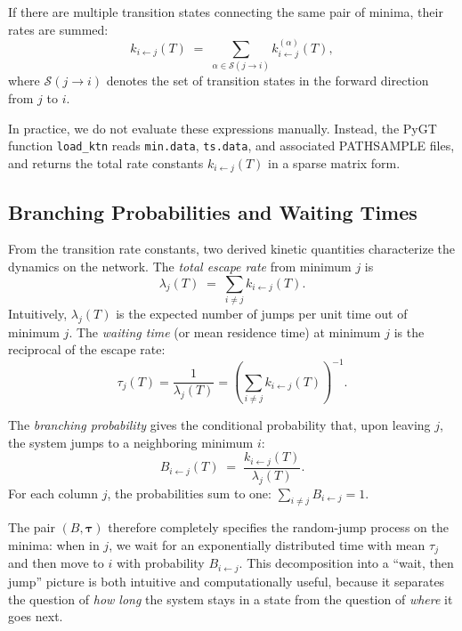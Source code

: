 If there are multiple transition states connecting the same pair of minima, their
rates are summed:
\begin{equation}\label{eq:kij-sum}
  k_{i\leftarrow j}(T)
  \;=\;
  \sum_{\alpha \in \mathcal{S}(j\to i)} k^{(\alpha)}_{i\leftarrow j}(T),
\end{equation}
where $\mathcal{S}(j\to i)$ denotes the set of transition states in the
forward direction from $j$ to $i$.

In practice, we do not evaluate these expressions manually. Instead, the
PyGT function \texttt{load\_ktn} reads \texttt{min.data},
\texttt{ts.data}, and associated PATHSAMPLE files, and returns the total
rate constants $k_{i\leftarrow j}(T)$ in a sparse matrix form.


\subsection{Branching Probabilities and Waiting Times}\label{subsec:branching}

From the transition rate constants, two derived kinetic quantities characterize the
dynamics on the network. The \emph{total escape rate} from minimum $j$ is
\begin{equation}\label{eq:escape-rate}
  \lambda_j(T) \;=\; \sum_{i\neq j} k_{i\leftarrow j}(T).
\end{equation}
Intuitively, $\lambda_j(T)$ is the expected number of jumps per unit time out of
minimum $j$. The \emph{waiting time} (or mean residence time) at minimum $j$ is the
reciprocal of the escape rate:
\begin{equation}\label{eq:tau}
  \tau_j(T) = \frac{1}{\lambda_j(T)} = \left( \sum_{i\neq j} k_{i\leftarrow j}(T) \right)^{-1}.
\end{equation}

The \emph{branching probability} gives the conditional probability that, upon leaving
$j$, the system jumps to a neighboring minimum $i$:
\begin{equation}\label{eq:branching-prob}
  B_{i\leftarrow j}(T)
  \;=\;
  \frac{k_{i\leftarrow j}(T)}{\lambda_j(T)}.
\end{equation}
For each column $j$, the probabilities sum to one: $\sum_{i\neq j} B_{i\leftarrow j} = 1$.

The pair $(B,\boldsymbol{\tau})$ therefore completely specifies the random-jump process
on the minima: when in $j$, we wait for an exponentially distributed time with mean
$\tau_j$ and then move to $i$ with probability $B_{i\leftarrow j}$. This decomposition
into a ``wait, then jump'' picture is both intuitive and computationally useful, because
it separates the question of \emph{how long} the system stays in a state from the
question of \emph{where} it goes next.


